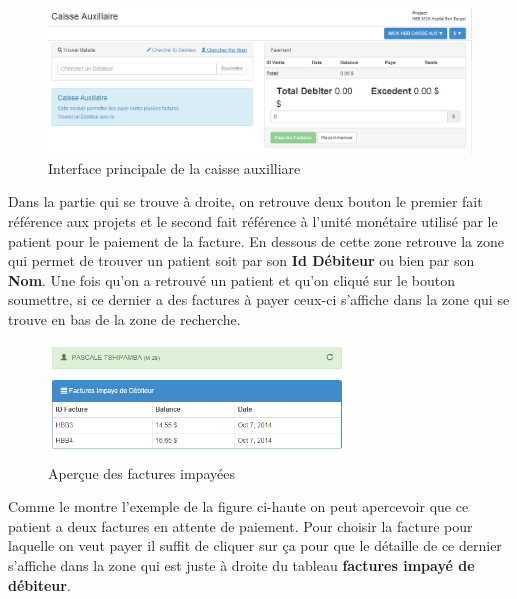 \documentclass[12pt,a4paper]{report}
\begin{document}
\begin{figure}[h]
\begin{center}
\includegraphics[width=14cm]{pic/CaisseAuxillaire.png}
\end{center}
\caption{Interface principale de la caisse auxilliare}
\label{Interface principale de la caisse auxilliare}
\end{figure}

Dans la partie qui se trouve à droite, on retrouve deux bouton le premier fait référence aux projets et le second fait référence à l'unité monétaire utilisé par le patient pour le paiement de la facture. En dessous de cette zone retrouve la zone qui permet de trouver un patient soit par son \textbf{Id Débiteur} ou bien par son \textbf{Nom}. 
Une fois qu'on a retrouvé un patient et qu'on cliqué sur le bouton soumettre, si ce dernier a des factures à payer ceux-ci s'affiche dans la zone qui se trouve en bas de la zone de recherche. 

\begin{figure}[h]
\begin{center}
\includegraphics[width=8cm]{pic/ViewInvoice.png}
\end{center}
\caption{Aperçue des factures impayées}
\label{Aperçue des factures impayées}
\end{figure}

\newpage
Comme le montre l'exemple de la figure ci-haute on peut apercevoir que ce patient a deux factures en attente de paiement. Pour choisir la facture pour laquelle on veut payer il suffit de cliquer sur ça pour que le détaille de ce dernier s'affiche dans la zone qui est juste à droite du tableau \textbf{factures impayé de débiteur}.
\end{document}

